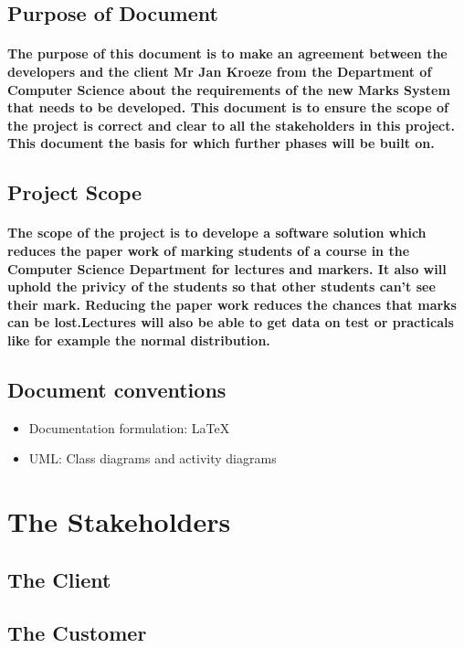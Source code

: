 \documentclass[12pt,a4paper]{article}
\begin{document}
\subsection{Purpose of Document}
\paragraph{The purpose of this document is to make an agreement between the developers and the client Mr Jan Kroeze from the Department of Computer Science about the requirements of the new Marks System that needs to be developed. This document is to ensure the scope of the project is correct and clear to all the stakeholders in this project. This document the basis for which further phases will be built on.}
\subsection{Project Scope}
\paragraph{The scope of the project is to develope a software solution which reduces the paper work of marking students of a course in the Computer Science Department for lectures and markers. It also will uphold the privicy of the students so that other students can't see their mark. Reducing the paper work reduces the chances that marks can be lost.Lectures will also be able to get data on test or practicals like for example the normal distribution.}
\subsection{Document conventions}
\begin{itemize}
\item Documentation formulation: LaTeX
\item UML: Class diagrams and activity diagrams
\end{itemize}
\pagebreak
\section{The Stakeholders}
\subsection{The Client}
\subsection{The Customer}
\end{document}
